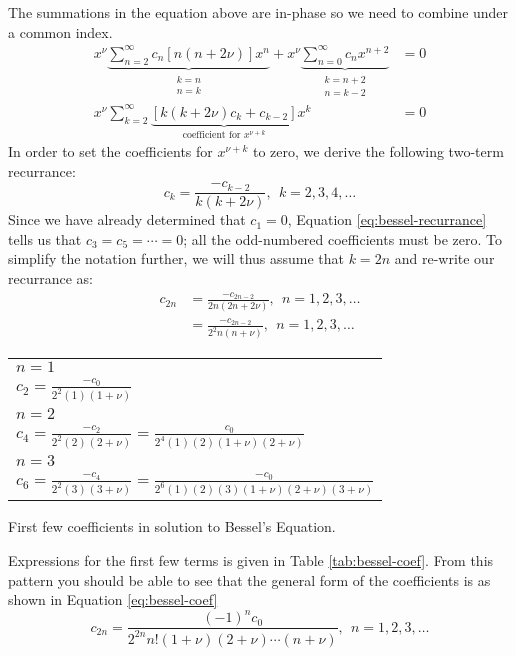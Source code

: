 The summations in the equation above are in-phase so we need to combine under a common index. 
\begin{align*}
x^{\nu}\underbrace{\sum\limits_{n=2}^{\infty}c_n[n(n+2\nu)]x^n}_{\substack{k=n \\ n=k}} + x^{\nu}\underbrace{\sum\limits_{n=0}^{\infty}c_nx^{n+2}}_{\substack{k=n+2 \\ n=k-2}} &= 0 \\
x^{\nu}\sum\limits_{k=2}^{\infty}\underbrace{\left[k(k+2\nu)c_k + c_{k-2}\right]}_{\text{coefficient for } x^{\nu+k}}x^{k} &= 0
\end{align*}
In order to set the coefficients for $x^{\nu+k}$ to zero, we derive the following two-term recurrance:
\begin{equation}
c_k = \frac{-c_{k-2}}{k(k+2\nu)}, \ \ k=2,3,4,\dots
\label{eq:bessel-recurrance}
\end{equation}
Since we have already determined that $c_1=0$, Equation \ref{eq:bessel-recurrance} tells us that $c_3=c_5=\cdots=0$; all the odd-numbered coefficients must be zero. To simplify the notation further, we will thus assume that $k=2n$ and re-write our recurrance as:
\begin{align*}
c_{2n} &= \frac{-c_{2n-2}}{2n(2n+2\nu)}, \ \ n=1,2,3,\dots \\
&=\frac{-c_{2n-2}}{2^2n(n+\nu)}, \ \ n=1,2,3,\dots
\end{align*}
\begin{margintable}
\begin{tabular}{|l|}
\hline
$n=1$ \\
$c_2 = \frac{-c_0}{2^2(1)(1+\nu)}$ \\\hline
$n=2$ \\
$c_4 = \frac{-c_2}{2^2 (2)(2+\nu)} = \frac{c_0}{2^4(1)(2)(1+\nu)(2+\nu)}$\\\hline
$n=3$ \\
$c_6 = \frac{-c_4}{2^2 (3)(3+\nu)} = \frac{-c_0}{2^6(1)(2)(3)(1+\nu)(2+\nu)(3+\nu)}$ \\\hline
\end{tabular}
\caption{First few coefficients in solution to Bessel's Equation.}
\label{tab:bessel-coef}
\end{margintable}
\noindent Expressions for the first few terms is given in Table \ref{tab:bessel-coef}. From this pattern you should be able to see that the general form of the coefficients is as shown in Equation \ref{eq:bessel-coef}
\begin{equation}
c_{2n} = \frac{(-1)^n c_0}{2^{2n}n!(1+\nu)(2+\nu)\cdots(n+\nu)}, \ \ n=1,2,3,\dots
\label{eq:bessel-coef}
\end{equation}
